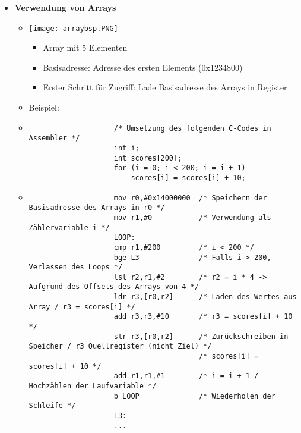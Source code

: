 \begin{itemize}
        \item \textbf{Verwendung von Arrays}
            \begin{itemize}
                \item[]
                    \begin{minipage}{0.35\textwidth}
                        \texttt{[image: arraybsp.PNG]}
                    \end{minipage}
                    \begin{minipage}{0.55\textwidth}
                        \begin{itemize}
                            \item Array mit 5 Elementen
                            \item Basisadresse: Adresse des ersten Elements (0x1234800)
                            \item Erster Schritt für Zugriff: Lade Basisadresse des Arrays in Register
                        \end{itemize}
                    \end{minipage}
                \item Beispiel:
                \item[]
                    \begin{verbatim}
                    /* Umsetzung des folgenden C-Codes in Assembler */
                    int i;
                    int scores[200];
                    for (i = 0; i < 200; i = i + 1)
                        scores[i] = scores[i] + 10;
                    \end{verbatim}
                \item[]
                    \begin{verbatim}
                    mov r0,#0x14000000  /* Speichern der Basisadresse des Arrays in r0 */
                    mov r1,#0           /* Verwendung als Zählervariable i */
                    LOOP:               
                    cmp r1,#200         /* i < 200 */
                    bge L3              /* Falls i > 200, Verlassen des Loops */
                    lsl r2,r1,#2        /* r2 = i * 4 -> Aufgrund des Offsets des Arrays von 4 */
                    ldr r3,[r0,r2]      /* Laden des Wertes aus Array / r3 = scores[i] */
                    add r3,r3,#10       /* r3 = scores[i] + 10 */
                    str r3,[r0,r2]      /* Zurückschreiben in Speicher / r3 Quellregister (nicht Ziel) */
                                        /* scores[i] = scores[i] + 10 */
                    add r1,r1,#1        /* i = i + 1 / Hochzählen der Laufvariable */
                    b LOOP              /* Wiederholen der Schleife */
                    L3:
                    ...
                    \end{verbatim}
            \end{itemize}
    \end{itemize}


